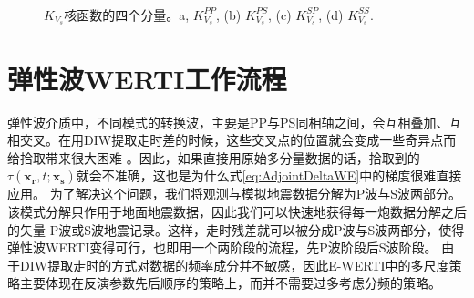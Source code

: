 \begin{figure}
   \centering
   \\
   \caption{$K_{V_s}$核函数的四个分量。a, $K_{V_s}^{PP}$, (b) $K_{V_s}^{PS}$, (c) $K_{V_s}^{SP}$, (d) $K_{V_s}^{SS}$.}
   \label{fig:kernel2_vs_decomp}
\end{figure}
\section{弹性波WERTI工作流程}
弹性波介质中，不同模式的转换波，主要是PP与PS同相轴之间，会互相叠加、互相交叉。在用DIW提取走时差的时候，这些交叉点的位置就会变成一些奇异点而给拾取带来很大困难
。因此，如果直接用原始多分量数据的话，拾取到的$\tau(\mathbf{x_r},t;\mathbf{x_s})$就会不准确，这也是为什么式\eqref{eq:AdjointDeltaWE}中的梯度很难直接应用。
为了解决这个问题，我们将观测与模拟地震数据分解为P波与S波两部分。该模式分解只作用于地面地震数据\cite[]{Li2016a}，因此我们可以快速地获得每一炮数据分解之后的矢量
P波或S波地震记录。这样，走时残差就可以被分成P波与S波两部分，使得弹性波WERTI变得可行，也即用一个两阶段的流程，先P波阶段后S波阶段。
由于DIW提取走时的方式对数据的频率成分并不敏感，因此E-WERTI中的多尺度策略主要体现在反演参数先后顺序的策略上，而并不需要过多考虑分频的策略。
